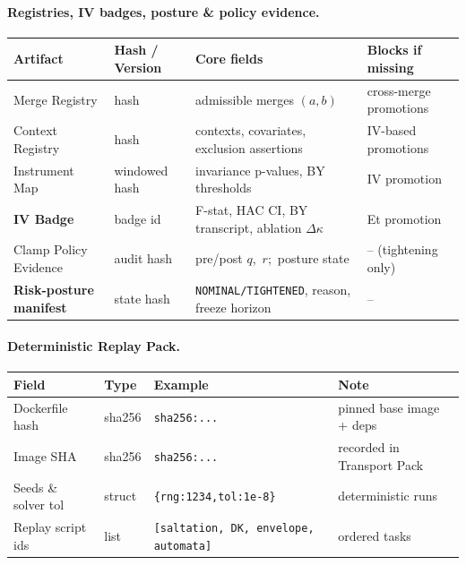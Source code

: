 \documentclass[10pt]{article}
\newcommand{\cutq}{q}
\begin{document}
\paragraph{Registries, IV badges, posture \& policy evidence.}
\begin{center}
\renewcommand{\arraystretch}{1.12}
\begin{tabularx}{\textwidth}{@{} l l X X @{}}
\toprule
\textbf{Artifact} & \textbf{Hash / Version} & \textbf{Core fields} & \textbf{Blocks if missing} \\
\midrule
Merge Registry & hash & admissible merges $(a,b)$ & cross-merge promotions \\
Context Registry & hash & contexts, covariates, exclusion assertions & IV-based promotions \\
Instrument Map & windowed hash & invariance p-values, BY thresholds & IV promotion \\
\textbf{IV Badge} & badge id & F-stat, HAC CI, BY transcript, ablation $\Delta\kappa$ & Et promotion \\
Clamp Policy Evidence & audit hash & pre/post $\cutq$,\ $r$;\ posture state & – (tightening only) \\
\textbf{Risk-posture manifest} & state hash & \texttt{NOMINAL/TIGHTENED}, reason, freeze horizon & – \\
\bottomrule
\end{tabularx}
\end{center}

\paragraph{Deterministic Replay Pack.}
\begin{center}
\renewcommand{\arraystretch}{1.12}
\begin{tabularx}{\textwidth}{@{} l l X X @{}}
\toprule
\textbf{Field} & \textbf{Type} & \textbf{Example} & \textbf{Note} \\
\midrule
Dockerfile hash & sha256 & \texttt{sha256:...} & pinned base image + deps \\
Image SHA & sha256 & \texttt{sha256:...} & recorded in Transport Pack \\
Seeds \& solver tol & struct & \texttt{\{rng:1234,tol:1e-8\}} & deterministic runs \\
Replay script ids & list & \texttt{[saltation, DK, envelope, automata]} & ordered tasks \\
\bottomrule
\end{tabularx}
\end{center}
\end{document}
